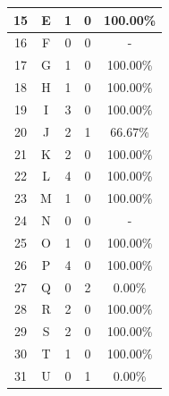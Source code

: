 \begin{longtable}[c]{|c|c|c|c|c|}
	15           & E                 & 1                       & 0                       &100.00\%            \\ \hline
	16           & F                 & 0                       & 0                       & -            \\ \hline
	17           & G                 & 1                       & 0                       &100.00\%            \\ \hline
	18           & H                 & 1                       & 0                       &100.00\%            \\ \hline
	19           & I                 & 3                       & 0                       &100.00\%            \\ \hline
	20           & J                 & 2                       & 1                       &66.67\%            \\ \hline
	21           & K                 & 2                       & 0                       &100.00\%            \\ \hline
	22           & L                 & 4                       & 0                       &100.00\%            \\ \hline
	23           & M                 & 1                       & 0                       &100.00\%            \\ \hline
	24           & N                 & 0                       & 0                       & -            \\ \hline
	25           & O                 & 1                       & 0                       &100.00\%            \\ \hline
	26           & P                 & 4                       & 0                       &100.00\%            \\ \hline
	27           & Q                 & 0                       & 2                       &0.00\%            \\ \hline
	28           & R                 & 2                       & 0                       &100.00\%            \\ \hline
	29           & S                 & 2                       & 0                       &100.00\%            \\ \hline
	30           & T                 & 1                       & 0                       &100.00\%            \\ \hline
	31           & U                 & 0                       & 1                       &0.00\%            \\ \hline

\end{longtable}

